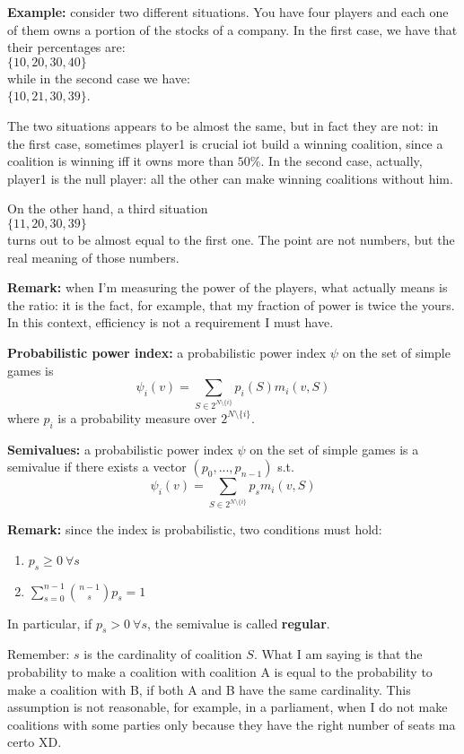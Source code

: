 \noindent \textbf{Example:} consider two different situations. You have 
four players and each one of them owns a portion of the stocks of a 
company. In the first case, we have that their percentages are:\\
$\{10, 20, 30, 40\}$\\
while in the second case we have: \\
$\{10, 21, 30, 39\}$.

\noindent The two situations appears to be almost the same, but in fact they are 
not: in the first case, sometimes player1 is crucial iot build a winning 
coalition, since a coalition is winning iff it owns more than $50\%$. 
In the second case, actually, player1 is the null player: all the other 
can make winning coalitions without him.

\noindent On the other hand, a third situation\\
$\{11, 20, 30, 39\}$\\
turns out to be almost equal to the first one. The point are not numbers, but 
the real meaning of those numbers.

\bigskip
\noindent \textbf{Remark:} when I'm measuring the power of the players, what 
actually means is the ratio: it is the fact, for example, that my fraction 
of power is twice the yours. In this context, efficiency is not a 
requirement I must have.

\bigskip
\noindent \textbf{Probabilistic power index:} a probabilistic power index $\psi$ on the set of simple games is
\[
	\psi_i(v) = \sum_{S \in 2^{N \setminus \{i\}}}p_i(S)m_i(v,S)
\]
where $p_i$ is a probability measure over $2^{N \setminus \{i\}}$.

\bigskip
\noindent \textbf{Semivalues:} a probabilistic power index $\psi$ on the set of simple games is a semivalue if there exists a vector $(p_0,...,p_{n-1})$ s.t.
\[
	\psi_i(v) = \sum_{S \in 2^{N \setminus \{i\}}}p_sm_i(v,S)
\]

\bigskip
\noindent \textbf{Remark:} since the index is probabilistic, two conditions must hold:
\begin{enumerate}
	\item $p_s \geq 0 ~\forall s$
	\item $\sum_{s=0}^{n-1}\binom{n-1}{s}p_s = 1$
\end{enumerate}
In particular, if $p_s > 0 ~\forall s$, the semivalue is called \textbf{regular}.

\bigskip
\noindent Remember: $s$ is the cardinality of coalition $S$. What I am saying 
is that the probability to make a coalition with coalition A is equal to 
the probability to make a coalition with B, if both A and B have the same 
cardinality. This assumption is not reasonable, for example, in a parliament, 
when I do not make coalitions with some parties only because they have the 
right number of seats {\huge ma certo XD}.

